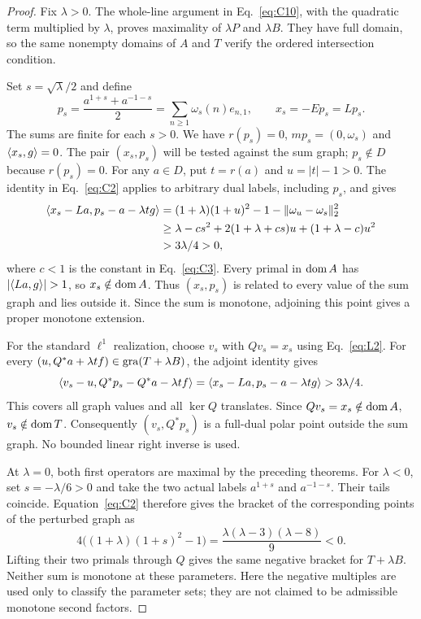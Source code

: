 \begin{proof}
Fix $\lambda>0$. The whole-line argument in Eq.~\eqref{eq:C10}, with
the quadratic term multiplied by $\lambda$, proves maximality of
$\lambda P$ and $\lambda B$. They have full domain, so the same nonempty
domains of $A$ and $T$ verify the ordered intersection condition.

Set $s=\sqrt\lambda/2$ and define
\begin{equation}
p_s=\frac{a^{1+s}+a^{-1-s}}2
   =\sum_{n\ge1}\omega_s(n)e_{n,1},\qquad x_s=-Ep_s=Lp_s.
\label{eq:parameter-query}
\end{equation}
The sums are finite for each $s>0$. We have $r(p_s)=0$,
$mp_s=(0,\omega_s)$ and $\langle x_s,g\rangle=0$. The pair $(x_s,p_s)$ will be tested against the sum graph; $p_s\notin D$
because $r(p_s)=0$.
For any $a\in D$, put $t=r(a)$ and $u=|t|-1>0$.
The identity in Eq.~\eqref{eq:C2} applies to arbitrary dual labels,
including $p_s$, and gives
\begin{equation}
\begin{aligned}
\langle x_s-La,p_s-a-\lambda t g\rangle
 &=(1+\lambda)(1+u)^2-1-\|\omega_u-\omega_s\|_2^2\\
 &\ge\lambda-cs^2+2(1+\lambda+cs)u+(1+\lambda-c)u^2\\
 &>3\lambda/4>0,
\end{aligned}
\label{eq:parameter-bracket}
\end{equation}
where $c<1$ is the constant in Eq.~\eqref{eq:C3}.
Every primal in $\operatorname{dom} A$ has $|\pair{La}{g}|>1$, so $x_s\notin\operatorname{dom} A$.
Thus $(x_s,p_s)$ is related to every value of the sum graph and lies
outside it. Since the sum is monotone, adjoining this point gives a
proper monotone extension.

For the standard $\ell^1$ realization, choose $v_s$ with $Qv_s=x_s$
using Eq.~\eqref{eq:L2}. For every $(u,Q^*a+\lambda t f)\in\operatorname{gra}(T+\lambda B)$,
the adjoint identity gives
\begin{equation}
\langle v_s-u,Q^*p_s-Q^*a-\lambda t f\rangle
=\langle x_s-La,p_s-a-\lambda t g\rangle>3\lambda/4.
\label{eq:parameter-l1}
\end{equation}
This covers all graph values and all $\ker Q$ translates.
Since $Qv_s=x_s\notin\operatorname{dom} A$, $v_s\notin\operatorname{dom} T$.
Consequently $(v_s,Q^*p_s)$ is a full-dual polar point outside the sum
graph. No bounded linear right inverse is used.

At $\lambda=0$, both first operators are maximal by the preceding
theorems. For $\lambda<0$, set $s=-\lambda/6>0$ and take the two actual
labels $a^{1+s}$ and $a^{-1-s}$. Their tails coincide. Equation~\eqref{eq:C2}
therefore gives the bracket of the corresponding points of the perturbed graph as
\begin{equation}
4\big((1+\lambda)(1+s)^2-1\big)
=\frac{\lambda(\lambda-3)(\lambda-8)}9<0.
\label{eq:parameter-negative}
\end{equation}
Lifting their two primals through $Q$ gives the same negative bracket
for $T+\lambda B$. Neither sum is monotone at these parameters.
Here the negative multiples are used only to classify the parameter
sets; they are not claimed to be admissible monotone second factors.


\end{proof}
